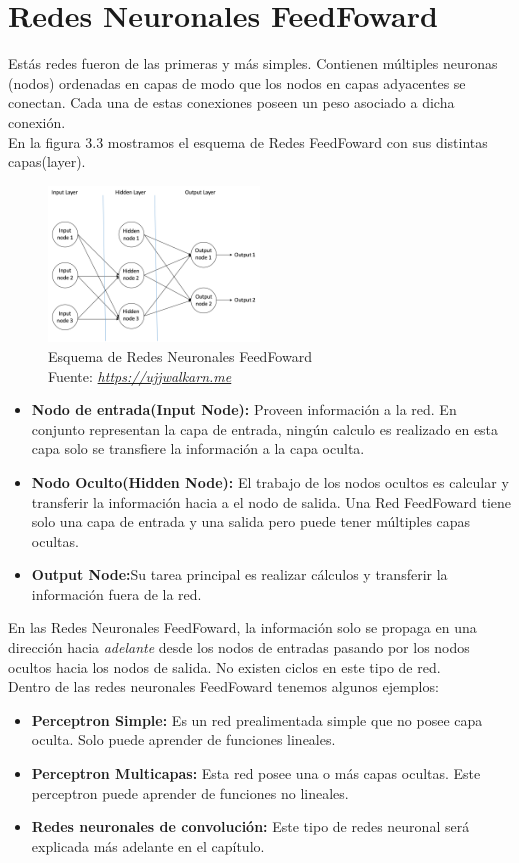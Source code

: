 \section{Redes Neuronales FeedFoward}
Estás redes fueron de las primeras y más simples. Contienen múltiples neuronas (nodos) ordenadas en capas de modo que los nodos en capas adyacentes se conectan. Cada una de estas conexiones poseen un peso asociado a dicha conexión.\\
En la figura 3.3 mostramos el esquema de Redes FeedFoward con sus distintas capas(layer).
\begin{figure}[H]
	\centering
	\includegraphics[width=0.5\textwidth]{Figures/esquemaff.png}
	\caption{Esquema de Redes Neuronales FeedFoward \\ Fuente:  \href{https://ujjwalkarn.me/2016/08/09/quick-intro-neural-networks/}{\textit{https://ujjwalkarn.me}}}
	\label{neuronasredes}
\end{figure} 
\begin{itemize}
	\item \textbf{Nodo de entrada(Input Node):} Proveen información a la red. En conjunto representan la capa de entrada, ningún calculo es realizado en esta capa solo se transfiere la información a la capa oculta.
	\item \textbf{Nodo Oculto(Hidden Node):} El trabajo de los nodos ocultos es calcular y transferir la información hacia a el nodo de salida. Una Red FeedFoward tiene solo una capa de entrada y una salida pero puede tener múltiples capas ocultas.
	\item \textbf{Output Node:}Su tarea principal es realizar cálculos y transferir la información fuera de la red.
\end{itemize}
En las Redes Neuronales FeedFoward, la información solo se propaga en una dirección hacia \textit{adelante} desde los nodos de entradas pasando por los nodos ocultos hacia los nodos de salida. No existen ciclos en este tipo de red.\\
Dentro de las redes neuronales FeedFoward tenemos algunos ejemplos:
\begin{itemize}
	\item \textbf{Perceptron Simple:} Es un red prealimentada simple que no posee capa oculta. Solo puede aprender de funciones lineales.
	\item \textbf{Perceptron Multicapas:} Esta red posee una o más capas ocultas. Este perceptron puede aprender de funciones no lineales.
	\item \textbf{Redes neuronales de convolución:} Este tipo de redes neuronal será explicada más adelante en el capítulo.
\end{itemize}
